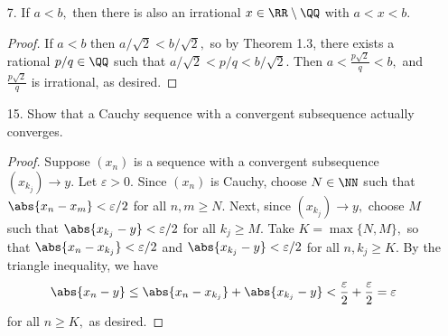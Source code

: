 \documentclass{article}
\begin{document}
\begin{itemize}
\begin{proof}
\begin{subproof}
				$(\impliedby):$ Suppose there exists a lower bound $b$ for $A$ such that $b>m.$ Then let $\varepsilon=b-m>0.$ Then $m+\varepsilon = m+(b-m) = b,$ but since $b$ is a lower bound for $A,$ there cannot exist $a\in A$ such that $a<b,$ contradicting (ii). Thus, $b$ does not exist, so $m\ge b$ for all lower bounds $b,$ and thus $m=\inf A.$
			\end{subproof}
		\end{proof}

	\item[7.] If $a<b,$ then there is also an irrational $x\in \RR\setminus\QQ$ with $a<x<b.$
		\begin{proof}
			If $a<b$ then $a/\sqrt{2}<b/\sqrt{2},$ so by Theorem 1.3, there exists a rational $p/q\in\QQ$ such that $a/\sqrt{2}<p/q<b/\sqrt{2}.$ Then $a<\frac{p\sqrt{2}}{q}<b,$ and $\frac{p\sqrt{2}}{q}$ is irrational, as desired.
		\end{proof}

	\item[15.] Show that a Cauchy sequence with a convergent subsequence actually converges.
		\begin{proof}
			Suppose $(x_n)$ is a sequence with a convergent subsequence $(x_{k_j})\to y.$ Let $\varepsilon>0.$ Since $(x_n)$ is Cauchy, choose $N\in \NN$ such that $\abs{x_n-x_m}< \varepsilon/2$ for all $n, m\ge N.$ Next, since $(x_{k_j})\to y,$ choose $M$ such that $\abs{x_{k_j}-y}< \varepsilon/2$ for all $k_j\ge M.$ Take $K=\max\{N, M\},$ so that $\abs{x_n-x_{k_j}}<\varepsilon/2$ and $\abs{x_{k_j}-y}<\varepsilon/2$ for all $n, k_j\ge K.$ By the triangle inequality, we have
			\begin{align*}
				\abs{x_n-y}\le \abs{x_n-x_{k_j}}+\abs{x_{k_j}-y} < \frac{\varepsilon}{2} + \frac{\varepsilon}{2} = \varepsilon
			\end{align*}
			for all $n\ge K,$ as desired.
		\end{proof}


\end{itemize}
\end{document}
